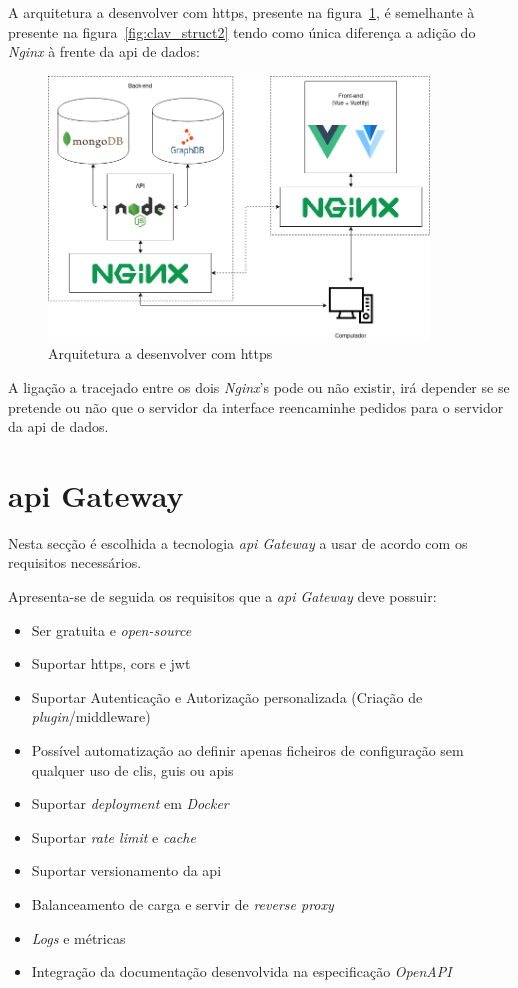 A arquitetura a desenvolver com \acrshort{https}, presente na figura~\ref{fig:apiHttpsArch}, é semelhante à presente na figura~\ref{fig:clav_struct2} tendo como única diferença a adição do \textit{Nginx} à frente da \acrshort{api} de dados:
\begin{figure}[H]
    \centering
    \includegraphics[width=0.9\textwidth]{img/apiHttpsArch.png}
    \caption{Arquitetura a desenvolver com \acrshort{https}\label{fig:apiHttpsArch}}
\end{figure}

A ligação a tracejado entre os dois \textit{Nginx}'s pode ou não existir, irá depender se se pretende ou não que o servidor da interface reencaminhe pedidos para o servidor da \acrshort{api} de dados.

\section{\acrshort{api} Gateway}

Nesta secção é escolhida a tecnologia \textit{\acrshort{api} Gateway} a usar de acordo com os requisitos necessários.

Apresenta-se de seguida os requisitos que a \textit{\acrshort{api} Gateway} deve possuir:
\begin{itemize}
    \item Ser gratuita e \textit{open-source}
    \item Suportar \acrshort{https}, \acrshort{cors} e \acrshort{jwt}
    \item Suportar Autenticação e Autorização personalizada (Criação de \textit{plugin}/middleware)
    \item Possível automatização ao definir apenas ficheiros de configuração sem qualquer uso de \acrshort{cli}s, \acrshort{gui}s ou \acrshort{api}s
    \item Suportar \textit{deployment} em \textit{Docker}
    \item Suportar \textit{rate limit} e \textit{cache}
    \item Suportar versionamento da \acrshort{api}
    \item Balanceamento de carga e servir de \textit{reverse proxy}
    \item \textit{Logs} e métricas
    \item Integração da documentação desenvolvida na especificação \textit{OpenAPI}
\end{itemize}

